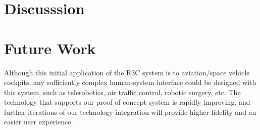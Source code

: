\section{Discusssion}

\section{Future Work}

Although this initial application of the R3C system is to aviation/space vehicle cockpits, any sufficiently complex human-system interface could be designed with this system, such as telerobotics, air traffic control, robotic surgery, etc.
The technology that supports our proof of concept system is rapidly improving, and further iterations of our technology integration will provide higher fidelity and an easier user experience.
